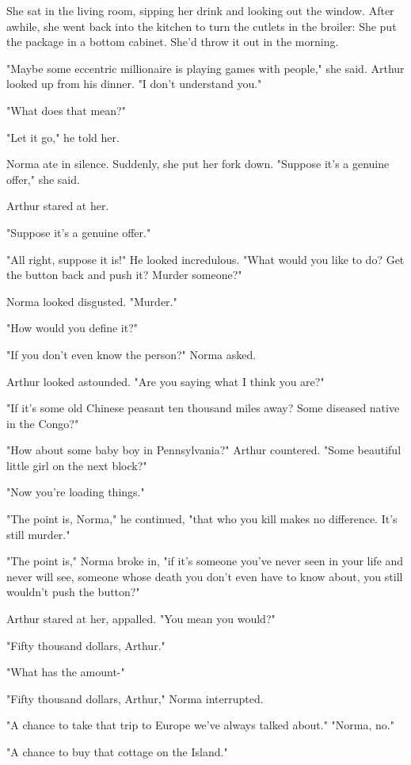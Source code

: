 \documentclass[10pt,a4paper]{book}
\begin{document}
She sat in the living room, sipping her drink and looking out the window. After awhile, she went back into the kitchen to turn the cutlets in the broiler: She put the package in a bottom cabinet. She'd throw it out in the morning.

"Maybe some eccentric millionaire is playing games with people," she said. Arthur looked up from his dinner. "I don't understand you."

"What does that mean?"

"Let it go," he told her.

Norma ate in silence. Suddenly, she put her fork down. "Suppose it's a genuine offer," she said.

Arthur stared at her.

"Suppose it's a genuine offer."



"All right, suppose it is!" He looked incredulous. "What would you like to do? Get the button back and push it? Murder someone?"

Norma looked disgusted. "Murder."

"How would you define it?"

"If you don't even know the person?" Norma asked.

Arthur looked astounded. "Are you saying what I think you are?"

"If it's some old Chinese peasant ten thousand miles away? Some diseased native in the Congo?"

"How about some baby boy in Pennsylvania?" Arthur countered. "Some beautiful little girl on the next block?"

"Now you're loading things."

"The point is, Norma," he continued, "that who you kill makes no difference. It's still murder."

"The point is," Norma broke in, "if it's someone you've never seen in your life and never will see, someone whose death you don't even have to know about, you still wouldn't push the button?"

Arthur stared at her, appalled. "You mean you would?"

"Fifty thousand dollars, Arthur."

"What has the amount-"

"Fifty thousand dollars, Arthur," Norma interrupted.

"A chance to take that trip to Europe we've always talked about." "Norma, no."

"A chance to buy that cottage on the Island."
\end{document}
